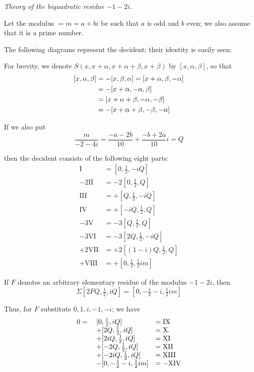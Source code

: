 \begin{center}\emph{Theory of the biquadratic residue $-1-2i$.}\end{center}
Let the modulus $=m=a+bi$ be such that $a$ is odd and $b$ even; we also assume that it is a prime number.

The following diagrams represent the decident; their identity is easily seen:
\begin{center}\resizebox{\textwidth}{!}{}\end{center}

For brevity, we denote $S(x,x+\alpha,x+\alpha+\beta,x+\beta)$ by $[x,\alpha,\beta]$, so that
\[
\begin{aligned}
\relax
[x,\alpha,\beta]&=-[x,\beta,\alpha]=[x+\alpha,\beta,-\alpha]\\
&=-[x+\alpha,-\alpha,\beta]\\
&=[x+\alpha+\beta,-\alpha,-\beta]\\
&=-[x+\alpha+\beta,-\beta,-\alpha]
\end{aligned}
\]

If we also put
\[
\frac{m}{-2-4i}=\frac{-a-2b}{10}+\frac{-b+2a}{10}i=Q
\]

then the decident consists of the following eight parts:
\[
\begin{aligned}
\mathrm{I}&=[0,\tfrac12,-iQ]\\
-2\mathrm{II}&=-2[0,\tfrac12,Q]\\
\mathrm{III}&=+[Q,\tfrac12,-iQ]\\
\mathrm{IV}&=+[-iQ,\tfrac12,Q]\\
-3\mathrm{V}&=-3[Q,\tfrac12,Q]\\
-3\mathrm{VI}&=-3[2Q,\tfrac12,-iQ]\\
+2\mathrm{VII}&=+2[(1-i)Q,\tfrac12,Q]\\
+\mathrm{VIII}&=+[0,\tfrac12,\tfrac12im]
\end{aligned}
\]

If $F$ denotes an arbitrary elementary residue of the modulus $-1-2i$, then
\[
\Sigma[2FQ,\tfrac12,iQ]=[0,-\tfrac12-i,\tfrac12im]
\]

Thus, for $F$ substitute $0,1,i,-1,-i$; we have
\[
\begin{array}{rll}
0={}&[0,\tfrac12,iQ]&=\mathrm{IX}\\
&+[2Q,\tfrac12,iQ]&=\mathrm{X}\mathbin{.}\\
&+[2iQ,\tfrac12,iQ]&=\mathrm{XI}\\
&+[-2Q,\tfrac12,iQ]&=\mathrm{XII}\\
&+[-2iQ,\tfrac12,iQ]&=\mathrm{XIII}\\
&-[0,-\tfrac12-i,\tfrac12im]&=-\mathrm{XIV}
\end{array}
\]

